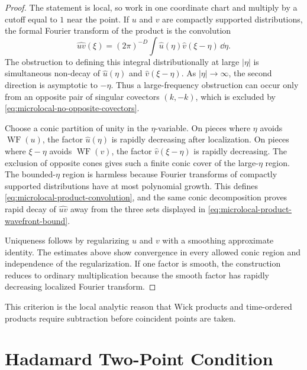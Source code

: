\begin{proof}
The statement is local, so work in one coordinate chart and multiply by a
cutoff equal to \(1\) near the point.  If \(u\) and \(v\) are compactly
supported distributions, the formal Fourier transform of the product is the
convolution
\begin{equation}
  \widehat{uv}(\xi)
  =
  (2\pi)^{-D}\int \widehat u(\eta)\widehat v(\xi-\eta)\,\dd\eta .
  \label{eq:microlocal-product-convolution}
\end{equation}
The obstruction to defining this integral distributionally at large
\(|\eta|\) is simultaneous non-decay of \(\widehat u(\eta)\) and
\(\widehat v(\xi-\eta)\).  As \(|\eta|\to\infty\), the second direction is
asymptotic to \(-\eta\).  Thus a large-frequency obstruction can occur only
from an opposite pair of singular covectors \((k,-k)\), which is excluded by
\eqref{eq:microlocal-no-opposite-covectors}.

Choose a conic partition of unity in the \(\eta\)-variable.  On pieces where
\(\eta\) avoids \(\operatorname{WF}(u)\), the factor \(\widehat u(\eta)\) is
rapidly decreasing after localization.  On pieces where \(\xi-\eta\) avoids
\(\operatorname{WF}(v)\), the factor \(\widehat v(\xi-\eta)\) is rapidly
decreasing.  The exclusion of opposite cones gives such a finite conic cover
of the large-\(\eta\) region.  The bounded-\(\eta\) region is harmless
because Fourier transforms of compactly supported distributions have at most
polynomial growth.  This defines
\eqref{eq:microlocal-product-convolution}, and the same conic decomposition
proves rapid decay of \(\widehat{uv}\) away from the three sets displayed in
\eqref{eq:microlocal-product-wavefront-bound}.

Uniqueness follows by regularizing \(u\) and \(v\) with a smoothing
approximate identity.  The estimates above show convergence in every allowed
conic region and independence of the regularization.  If one factor is
smooth, the construction reduces to ordinary multiplication because the
smooth factor has rapidly decreasing localized Fourier transform.
\end{proof}

This criterion is the local analytic reason that Wick products and
time-ordered products require subtraction before coincident points are taken.

\section{Hadamard Two-Point Condition}

